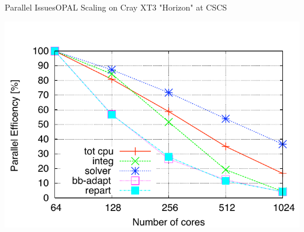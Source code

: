 \documentclass[xcolor=pdftex,table,10pt,yellow,mathserif]{beamer}
\newcommand{\opal}{\textsc{OPAL }}
\begin{document}
\begin{frame}{Parallel Issues}{\opal Scaling on Cray XT3  "Horizon" at CSCS}
\begin{center}
        \includegraphics[scale=0.45]{figures/timing-mult-2-PPP-large}  %
      \end{center}
\end{frame}
\end{document}
